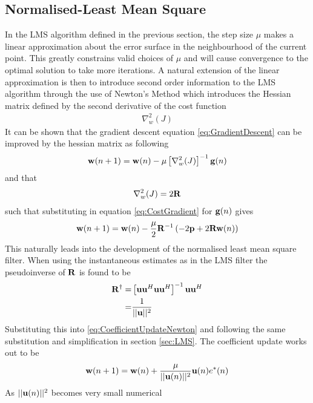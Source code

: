 \subsection{Normalised-Least Mean Square}
In the LMS algorithm defined in the previous section, %
the step size $\mu$ makes a linear approximation %
about the error surface in the neighbourhood of the %
current point. This greatly constrains valid choices %
of $\mu$ and will cause convergence to the %
optimal solution to take more iterations. %
A natural extension of the linear approximation is %
then to introduce second order information to the LMS %
algorithm through the use of Newton's Method which %
introduces the Hessian matrix defined by the second %
derivative of the cost function
\begin{align}
	\nabla_{w}^{2}(J)
\end{align}
It can be shown \cite{Hay02,Sayed03} that the %
gradient descent equation \ref{eq:GradientDescent} %
can be improved by the hessian matrix as following
\begin{align}
	\bold{w}(n+1) = \bold{w}(n) - \mu\left[\nabla_{w}^{2}(J)\right]^{-1}\bold{g}(n)
\end{align}
and that
\begin{align}
	\nabla_{w}^{2}(J) = 2\bold{R}
\end{align}
such that substituting in equation \ref{eq:CostGradient} for $\bold{g}(n)$ gives
\begin{align}
	\bold{w}(n+1) = \bold{w}(n) - \frac{\mu}{2}\bold{R}^{-1}\left(
	-2\bold{p} + 2\bold{R}\bold{w}(n)\right)
	\label{eq:CoefficientUpdateNewton}
\end{align}
This naturally leads into the development of the normalised %
least mean square filter. When using the instantaneous estimates %
as in the LMS filter the pseudoinverse of $\bold{R}$ is found to be
\begin{align}
	\bold{R}^{\dagger} =& \left[\bold{u}\bold{u}^{H}
	\bold{u}\bold{u}^{H}\right]^{-1}\bold{u}\bold{u}^{H}\\
	=& \frac{1}{\lvert\lvert\bold{u}\rvert\rvert^{2}}
\end{align}
Substituting this into \ref{eq:CoefficientUpdateNewton} and following %
the same substitution and simplification in section \ref{sec:LMS}. The
coefficient update works out to be
\begin{align}
	\bold{w}(n+1) = \bold{w}(n) + \frac{\mu}{\lvert\lvert\bold{u}(n)\rvert
	\rvert^{2}}\bold{u}(n)e^{*}(n)
	\label{eq:NLMS}
\end{align}
As $\lvert\lvert\bold{u}(n)\rvert\rvert^{2}$ becomes very small numerical %

